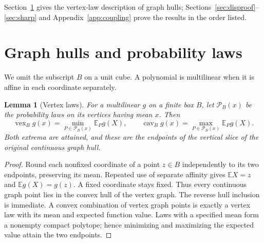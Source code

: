 \documentclass[11pt]{article}
\newtheorem{lemma}[theorem]{Lemma}
\theoremstyle{remark}
\DeclareMathOperator{\vex}{vex}
\DeclareMathOperator{\cav}{cav}
\newcommand{\E}{\mathbb E}
\newcommand{\laws}{\mathcal P}
\begin{document}
Section~\ref{sec:foundations} gives the vertex-law description of graph
hulls; Sections~\ref{sec:disproof}--\ref{sec:sharp} and
Appendix~\ref{app:coupling} prove the results in the order listed.

\section{Graph hulls and probability laws}\label{sec:foundations}
We omit the subscript $B$ on a unit cube. A polynomial is multilinear
when it is affine in each coordinate separately.

\begin{lemma}[Vertex laws]\label{lem:vertices}
For a multilinear $g$ on a finite box $B$, let $\laws_B(x)$ be the
probability laws on its vertices having mean $x$. Then
\[
 \vex_B g(x)=\min_{P\in\laws_B(x)}\E_Pg(X),\qquad
 \cav_B g(x)=\max_{P\in\laws_B(x)}\E_Pg(X).
\]
Both extrema are attained, and these are the endpoints of the vertical
slice of the original continuous graph hull.
\end{lemma}
\begin{proof}
Round each nonfixed coordinate of a point $z\in B$ independently to its
two endpoints, preserving its mean. Repeated use of separate affinity
gives $\E X=z$ and $\E g(X)=g(z)$. A fixed coordinate stays fixed.
Thus every continuous graph point lies in the convex hull of the vertex
graph. The reverse hull inclusion is immediate. A convex combination of
vertex graph points is exactly a vertex law with its mean and expected
function value. Laws with a specified mean form a nonempty compact
polytope; hence minimizing and maximizing the expected value attain the
two endpoints.
\end{proof}
\end{document}
